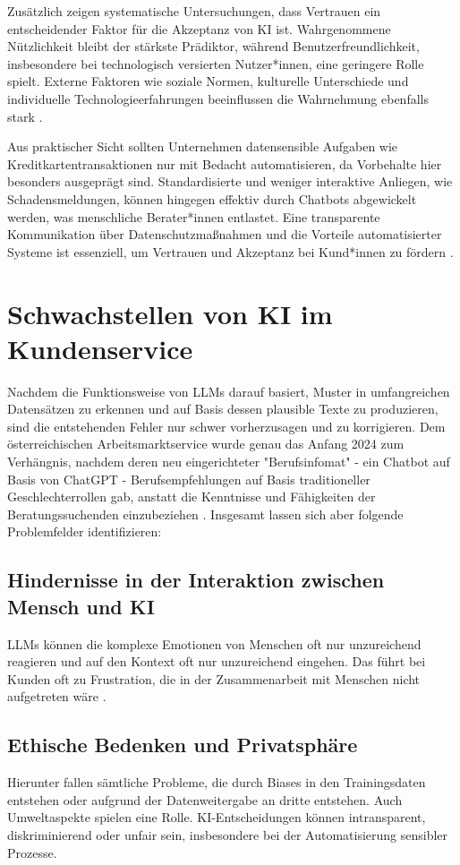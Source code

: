 \documentclass[12pt]{article}
\begin{document}
Zusätzlich zeigen systematische Untersuchungen, dass Vertrauen ein entscheidender Faktor für die Akzeptanz von KI ist. Wahrgenommene Nützlichkeit bleibt der stärkste Prädiktor, während Benutzerfreundlichkeit, insbesondere bei technologisch versierten Nutzer*innen, eine geringere Rolle spielt. Externe Faktoren wie soziale Normen, kulturelle Unterschiede und individuelle Technologieerfahrungen beeinflussen die Wahrnehmung ebenfalls stark \cite{kelly_what_2023}.

Aus praktischer Sicht sollten Unternehmen datensensible Aufgaben wie Kreditkartentransaktionen nur mit Bedacht automatisieren, da Vorbehalte hier besonders ausgeprägt sind. Standardisierte und weniger interaktive Anliegen, wie Schadensmeldungen, können hingegen effektiv durch Chatbots abgewickelt werden, was menschliche Berater*innen entlastet. Eine transparente Kommunikation über Datenschutzmaßnahmen und die Vorteile automatisierter Systeme ist essenziell, um Vertrauen und Akzeptanz bei Kund*innen zu fördern \cite{grotenhermen_wahrnehmungen_2021, kelly_what_2023}.


\section{Schwachstellen von KI im Kundenservice}

Nachdem die Funktionsweise von LLMs darauf basiert, Muster in umfangreichen Datensätzen zu erkennen und auf Basis dessen plausible Texte zu produzieren, sind die entstehenden Fehler nur schwer vorherzusagen und zu korrigieren.
Dem österreichischen Arbeitsmarktservice wurde genau das Anfang 2024 zum Verhängnis, nachdem deren neu eingerichteter "Berufsinfomat" - ein Chatbot auf Basis von ChatGPT - Berufsempfehlungen auf Basis traditioneller Geschlechterrollen gab, anstatt die Kenntnisse und Fähigkeiten der Beratungssuchenden einzubeziehen \cite{standardAMS}.
Insgesamt lassen sich aber folgende Problemfelder identifizieren:

\subsection{Hindernisse in der Interaktion zwischen Mensch und KI}
LLMs können die komplexe Emotionen von Menschen oft nur unzureichend reagieren und auf den Kontext oft nur unzureichend eingehen.
Das führt bei Kunden oft zu Frustration, die in der Zusammenarbeit mit Menschen nicht aufgetreten wäre \cite{pollmann2021kundenservice}.

\subsection{Ethische Bedenken und Privatsphäre}
Hierunter fallen sämtliche Probleme, die durch Biases in den Trainingsdaten entstehen oder aufgrund der Datenweitergabe an dritte entstehen. 
Auch Umweltaspekte spielen eine Rolle. 
KI-Entscheidungen können intransparent, diskriminierend oder unfair sein, insbesondere bei der Automatisierung sensibler Prozesse. \cite{andezion_grundlagen_2024}
\end{document}
